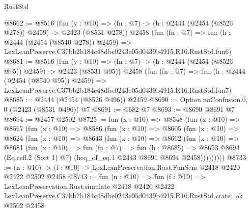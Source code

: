 \begin{lexlean}{RustStd}
\begin{coremodule}
@8662 := @8516
    (fun (y : @10) => (fn : @7) -> (h : @2444 (@2454 (@8526 @278)) @2459) -> @2423 (@8531 @278))
    @2458
    (fun (fn : @7) =>
    fun (h : @2444 (@2454 (@8540 @278)) @2459) =>
    LexLeanPreserve.C37bb2b184c48dbe0243e05d0439b4915.R16.RustStd.fun6)
@8681 := @8516
    (fun (y : @10) => (fn : @7) -> (h : @2444 (@2454 (@8526 @95)) @2459) -> @2423 (@8531 @95))
    @2458
    (fun (fn : @7) =>
    fun (h : @2444 (@2454 (@8540 @95)) @2459) =>
    LexLeanPreserve.C37bb2b184c48dbe0243e05d0439b4915.R16.RustStd.fun7)
@8685 := @2444 (@2454 (@8526 @496)) @2459
@8690 := Option.noConfusion.{0, 0} (@2423 (@8531 @496)) @7
@8691 := @682 @7
@8693 := @8690 @8691 @7
@8694 := @2457 @2502
@8725 := fun (x : @10) =>
  @8548
    (fun (x : @10) =>
    @8567
      (fun (x : @10) =>
      @8586
        (fun (x : @10) =>
        @8605
          (fun (x : @10) =>
          @8624
            (fun (x : @10) =>
            @8643
              (fun (x : @10) =>
              @8662
                (fun (x : @10) =>
                @8681
                  (fun (x : @10) =>
                  fun (fn : @7) =>
                  fun (h : @8685) =>
                  @8693
                    @8694
                    (Eq.refl.{2} (Sort 1) @7)
                    (heq_of_eq.{1} @2443 @8691 @8694 @2458)))))))))
@8733 := (n : @10) -> (f : @10) -> LexLeanPreservation.Rust.FunSem @2418 @2420 @2422 @2502 @2458
@8743 := fun (n : @10) =>
  fun (f : @10) =>
  LexLeanPreservation.Rust.simulate
    @2418
    @2420
    @2422
    LexLeanPreserve.C37bb2b184c48dbe0243e05d0439b4915.R16.RustStd.crate_ok
    @2502
    @2458
\end{coremodule}
\end{lexlean}
